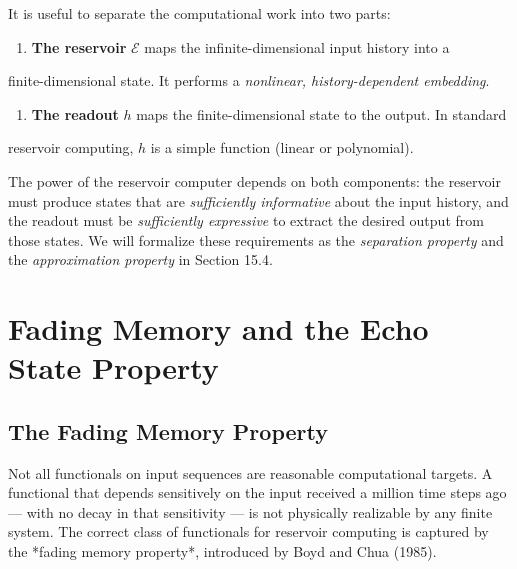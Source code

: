 It is useful to separate the computational work into two parts:

\begin{enumerate}[nosep]
  \item \textbf{The reservoir} $\mathcal{E}$ maps the infinite-dimensional input history into a
\end{enumerate}
   finite-dimensional state. It performs a \textit{nonlinear, history-dependent embedding}.

\begin{enumerate}[nosep]
  \item \textbf{The readout} $h$ maps the finite-dimensional state to the output. In standard
\end{enumerate}
   reservoir computing, $h$ is a simple function (linear or polynomial).

The power of the reservoir computer depends on both components: the reservoir must
produce states that are \textit{sufficiently informative} about the input history, and the
readout must be \textit{sufficiently expressive} to extract the desired output from those
states. We will formalize these requirements as the \textit{separation property} and the
\textit{approximation property} in Section 15.4.


\bigskip


\section{Fading Memory and the Echo State Property}\label{sec:15.2}

\subsection{The Fading Memory Property}\label{sec:15.2.1}

Not all functionals on input sequences are reasonable computational targets. A
functional that depends sensitively on the input received a million time steps ago ---
with no decay in that sensitivity --- is not physically realizable by any finite system.
The correct class of functionals for reservoir computing is captured by the *fading
memory property*, introduced by Boyd and Chua (1985).

